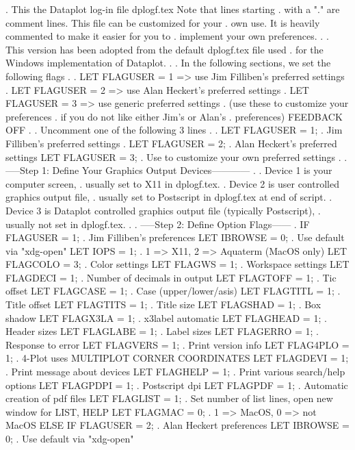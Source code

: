 .  This the Dataplot log-in file dplogf.tex  Note that lines starting
.  with a "." are comment lines.  This file can be customized for your
.  own use.  It is heavily commented to make it easier for you to
.  implement your own preferences.
.
.  This version has been adopted from the default dplogf.tex file used
.  for the Windows implementation of Dataplot.
.
.  In the following sections, we set the following flags
.
.     LET FLAGUSER = 1  => use Jim Filliben's preferred settings
.     LET FLAGUSER = 2  => use Alan Heckert's preferred settings
.     LET FLAGUSER = 3  => use generic preferred settings
.                          (use these to customize your preferences
.                          if you do not like either Jim's or Alan's
.                          preferences)
FEEDBACK OFF
.
.  Uncomment one of the following 3 lines
.
. LET FLAGUSER = 1; . Jim Filliben's preferred settings
. LET FLAGUSER = 2; . Alan Heckert's preferred settings
LET FLAGUSER = 3; . Use to customize your own preferred settings
.
. -----Step 1: Define Your Graphics Output Devices------------
.
. Device 1 is your computer screen,
.          usually set to X11 in dplogf.tex.
. Device 2 is user controlled graphics output file,
.          usually set to Postscript in dplogf.tex at end of script.
. Device 3 is Dataplot controlled graphics output file (typically Postscript),
.          usually not set in dplogf.tex.
.
. -----Step 2: Define Option Flags------
.
IF FLAGUSER = 1;      . Jim Filliben's preferences
   LET IBROWSE = 0;   . Use default via "xdg-open"
   LET IOPS = 1;      . 1 => X11, 2 => Aquaterm (MacOS only)
   LET FLAGCOLO = 3;  . Color settings
   LET FLAGWS = 1;    . Workspace settings
   LET FLAGDECI = 1;  . Number of decimals in output
   LET FLAGTOFF = 1;  . Tic offset
   LET FLAGCASE = 1;  . Case (upper/lower/asis)
   LET FLAGTITL = 1;  . Title offset
   LET FLAGTITS = 1;  . Title size
   LET FLAGSHAD = 1;  . Box shadow
   LET FLAGX3LA = 1;  . x3label automatic
   LET FLAGHEAD = 1;  . Header sizes
   LET FLAGLABE = 1;  . Label sizes
   LET FLAGERRO = 1;  . Response to error
   LET FLAGVERS = 1;  . Print version info
   LET FLAG4PLO = 1;  . 4-Plot uses MULTIPLOT CORNER COORDINATES
   LET FLAGDEVI = 1;  . Print message about devices
   LET FLAGHELP = 1;  . Print various search/help options
   LET FLAGPDPI = 1;  . Postscript dpi
   LET FLAGPDF  = 1;  . Automatic creation of pdf files
   LET FLAGLIST = 1;  . Set number of list lines, open new window for LIST, HELP
   LET FLAGMAC  = 0;  . 1 => MacOS, 0 => not MacOS
ELSE IF FLAGUSER = 2; . Alan Heckert preferences
   LET IBROWSE = 0;   . Use default via "xdg-open"
